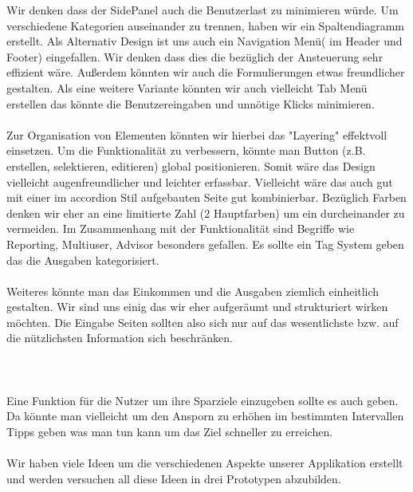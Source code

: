 \documentclass[runningheads,a4paper]{llncs}
\begin{document}
Wir denken dass der SidePanel auch die  Benutzerlast zu minimieren würde. Um verschiedene Kategorien auseinander zu trennen, haben wir ein Spaltendiagramm erstellt. Als Alternativ Design ist uns auch ein Navigation Menü( im Header und Footer) eingefallen. Wir denken dass dies die bezüglich der Ansteuerung sehr effizient wäre. Außerdem könnten wir auch die Formulierungen etwas freundlicher gestalten. Als eine weitere Variante könnten wir auch vielleicht Tab Menü erstellen das könnte die Benutzereingaben und unnötige Klicks minimieren.\\\\
Zur Organisation von Elementen könnten wir hierbei das "Layering" effektvoll einsetzen. Um die Funktionalität zu verbessern, könnte man Button (z.B. erstellen, selektieren, editieren) global positionieren. Somit wäre das Design vielleicht augenfreundlicher und leichter erfassbar. Vielleicht wäre das auch gut mit einer im accordion Stil aufgebauten Seite gut kombinierbar. 
Bezüglich Farben denken wir eher an eine limitierte Zahl (2 Hauptfarben) um ein durcheinander zu vermeiden. Im Zusammenhang mit der Funktionalität sind Begriffe wie Reporting, Multiuser, Advisor besonders gefallen. Es sollte ein Tag System geben das die Ausgaben kategorisiert. \\ \\ 
 Weiteres könnte man das Einkommen und die Ausgaben ziemlich einheitlich gestalten. Wir sind uns einig das wir eher aufgeräumt und strukturiert wirken möchten. Die Eingabe Seiten sollten also sich nur auf das wesentlichste bzw. auf die nützlichsten Information sich beschränken. \\\\ \\  \\  Eine Funktion für die Nutzer um ihre Sparziele einzugeben sollte es auch geben. \\
Da könnte man vielleicht um den Ansporn zu erhöhen im bestimmten Intervallen Tipps geben was man tun kann um das Ziel schneller zu erreichen. \\ \\ Wir haben viele Ideen um die verschiedenen Aspekte unserer Applikation erstellt und werden versuchen all diese Ideen in drei Prototypen abzubilden. 
\end{document}
